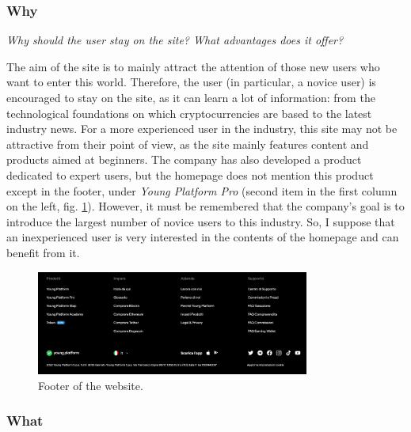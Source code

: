 \newpage

\subsubsection{Why}

\centerline{\textit{Why should the user stay on the site? What advantages 
does it offer?}}
The aim of the site is to mainly attract the attention of those new users 
who want to enter this world. Therefore, the user (in particular, a novice 
user) is encouraged to stay on the site, as it can learn a lot of 
information: from the technological foundations on which cryptocurrencies are 
based to the latest industry news. For a more experienced user in the 
industry, this site may not be attractive from their point of view, as the 
site mainly features content and products aimed at beginners. The company 
has also developed a product dedicated to expert users, but the homepage 
does not mention this product except in the footer, under 
\textit{Young Platform Pro} (second item in the first column on the left, 
fig. \ref{fig:footer}). However, it must be remembered that the company's 
goal is to introduce the largest number of novice users to this industry. 
So, I suppose that an inexperienced user is very interested in the contents 
of the homepage and can benefit from it.

\begin{figure}[H]
	\centering
	\includegraphics[width=0.80\textwidth]{res/images/footer.png}
	\caption{Footer of the website.}
	\label{fig:footer}
\end{figure}

\subsubsection{What}

